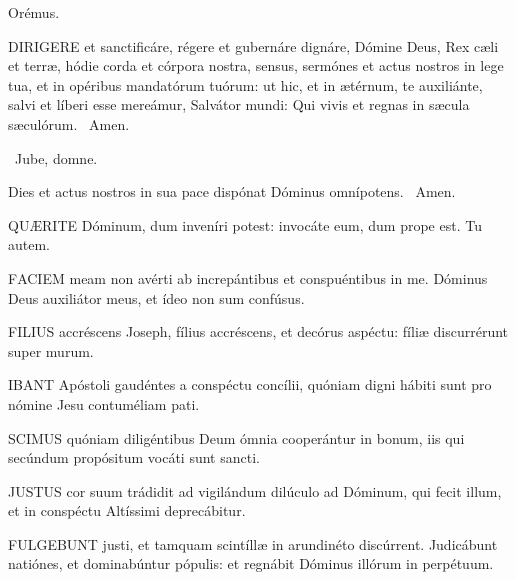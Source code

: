 Orémus. 

\lettrine[lines=2]{D}{IRIGERE} et sanctificáre, régere et gubernáre dignáre, Dómine Deus, Rex cæli et terræ, hódie corda et córpora nostra, sensus, sermónes et actus nostros in lege tua, et in opéribus mandatórum tuórum: ut hic, et in ætérnum, te auxiliánte, salvi et líberi esse mereámur, Salvátor mundi: Qui vivis et regnas in sæcula sæculórum. \R\ Amen.

\V\ Jube, domne.

 Dies et actus nostros in sua pace dispónat Dóminus omnípotens. \R\ Amen.



\lettrine[lines=2]{Q}{UÆRITE} Dóminum, dum inveníri potest: invocáte eum, dum prope est. Tu autem.


\lettrine[lines=2]{F}{ACIEM} meam non avérti ab increpántibus et conspuéntibus in me. Dóminus Deus auxiliátor meus, et ídeo non sum confúsus.



\lettrine[lines=2]{F}{ILIUS} accréscens Joseph, fílius accréscens, et decórus aspéctu: fíliæ discurrérunt super murum.



\lettrine[lines=2]{I}{BANT} Apóstoli gaudéntes a conspéctu concílii, quóniam digni hábiti sunt pro nómine Jesu contuméliam pati.


\lettrine[lines=2]{S}{CIMUS} quóniam diligéntibus Deum ómnia cooperántur in bonum, iis qui secúndum propósitum vocáti sunt sancti.


\lettrine[lines=2]{J}{USTUS} cor suum trádidit ad vigilándum dilúculo ad Dóminum, qui fecit illum, et in conspéctu Altíssimi deprecábitur.


\lettrine[lines=2]{F}{ULGEBUNT} justi, et tamquam scintíllæ in arundinéto discúrrent. Judicábunt natiónes, et dominabúntur pópulis: et regnábit Dóminus illórum in perpétuum.

